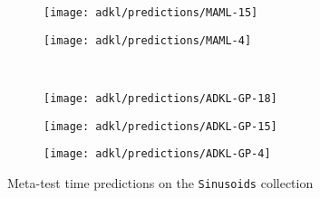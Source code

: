 \begin{figure}[ht]
\begin{subfigure}{.3\textwidth}
        \centering
        \texttt{[image: adkl/predictions/MAML-15]}
    \end{subfigure}
    \hfill
    \begin{subfigure}{.3\textwidth}
        \centering
        \texttt{[image: adkl/predictions/MAML-4]}
    \end{subfigure}
    \\
    \begin{subfigure}{.3\textwidth}
        \centering
        \texttt{[image: adkl/predictions/ADKL-GP-18]}
    \end{subfigure}
    \hfill
    \begin{subfigure}{.3\textwidth}
        \centering
        \texttt{[image: adkl/predictions/ADKL-GP-15]}
    \end{subfigure}
    \hfill
    \begin{subfigure}{.3\textwidth}
        \centering
        \texttt{[image: adkl/predictions/ADKL-GP-4]}
    \end{subfigure}
    \caption{Meta-test time predictions on the \texttt{Sinusoids} collection}
    \label{fig:app-predictions}
\end{figure}
